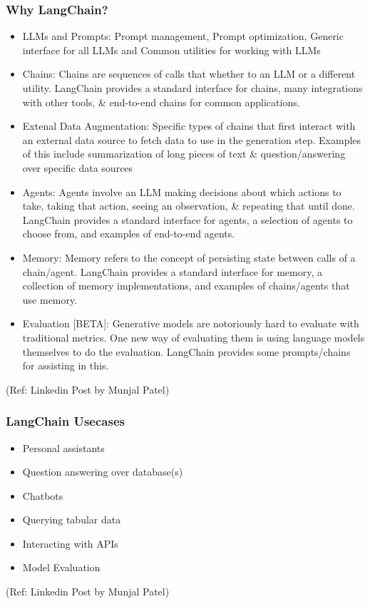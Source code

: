 \begin{frame}\frametitle{Why LangChain?}

\begin{itemize}
\item LLMs and Prompts: Prompt management, Prompt optimization, Generic interface for all LLMs and Common utilities for working with LLMs
\item Chains: Chains are sequences of calls that whether to an LLM or a different utility. LangChain provides a standard interface for chains, many integrations with other tools, \& end-to-end chains for common applications.
\item Extenal Data Augmentation: Specific types of chains that first interact with an external data source to fetch data to use in the generation step. Examples of this include summarization of long pieces of text \& question/answering over specific data sources
\item Agents: Agents involve an LLM making decisions about which actions to take, taking that action, seeing an observation, \& repeating that until done. LangChain provides a standard interface for agents, a selection of agents to choose from, and examples of end-to-end agents.
\item Memory: Memory refers to the concept of persisting state between calls of a chain/agent. LangChain provides a standard interface for memory, a collection of memory implementations, and examples of chains/agents that use memory.
\item Evaluation [BETA]: Generative models are notoriously hard to evaluate with traditional metrics. One new way of evaluating them is using language models themselves to do the evaluation. LangChain provides some prompts/chains for assisting in this.
\end{itemize}

{\tiny (Ref: Linkedin Post by Munjal Patel)}
\end{frame}

\begin{frame}\frametitle{LangChain Usecases}

\begin{itemize}
\item Personal assistants
\item Question answering over database(s)
\item Chatbots
\item Querying tabular data
\item Interacting with APIs
\item Model Evaluation
\end{itemize}


{\tiny (Ref: Linkedin Post by Munjal Patel)}
\end{frame}



